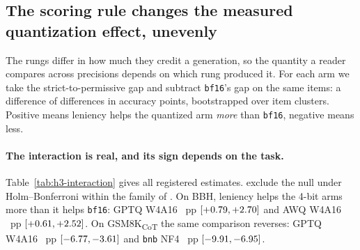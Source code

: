 \documentclass[conference]{IEEEtran}
\begin{document}
\subsection{The scoring rule changes the measured quantization effect, unevenly}
\label{sec:h3}


The rungs differ in how much they credit a generation, so the quantity a reader
compares across precisions depends on which rung produced it. For each arm we
take the strict-to-permissive gap and subtract \texttt{bf16}'s gap on the same
items: a difference of differences in accuracy points, bootstrapped over item
clusters. Positive means leniency helps the quantized arm \emph{more} than
\texttt{bf16}, negative means less.

\begin{table}[t]
\centering
\caption{Precision $\times$ scoring interaction in accuracy points against
\texttt{bf16}, under strict versus permissive extraction, on \hThreeRecords{}
generations.
\textbf{Bold} excludes the null. $\dagger$ marks a worst-case bound rather than a
bootstrap interval: ARC-C's estimate is \emph{exactly} zero, so there is nothing
to resample and the interval is the Wilson zero-event bound
(\S\ref{sec:h5h6}).}
\label{tab:h3-interaction}
\small

\end{table}

\paragraph{The interaction is real, and its sign depends on the task.}
Table~\ref{tab:h3-interaction} gives all \hThreeRows{} registered estimates.
\hThreeExcludesNull{} exclude the null under Holm--Bonferroni within the family
of \hThreeHolmM. On BBH, leniency helps the 4-bit arms more than it helps
\texttt{bf16}: GPTQ W4A16 \hThreeBbhGptqFour{}~pp
$[+0.79, +2.70]$ and AWQ W4A16 \hThreeBbhAwq{}~pp
$[+0.61, +2.52]$. On GSM8K\textsubscript{CoT} the same
comparison reverses: GPTQ W4A16 \hThreeGsmGptqFour{}~pp
$[-6.77, -3.61]$ and \texttt{bnb} NF4
\hThreeGsmNfFour{}~pp $[-9.91, -6.95]$.
\end{document}
